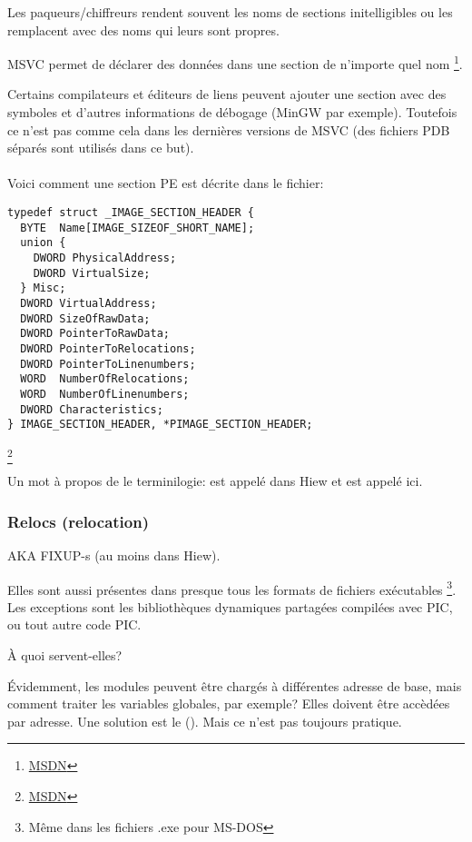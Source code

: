 Les paqueurs/chiffreurs rendent souvent les noms de sections initelligibles ou les
remplacent avec des noms qui leurs sont propres.

\ac{MSVC} permet de déclarer des données dans une section de n'importe quel nom
\footnote{\href{http://go.yurichev.com/17047}{MSDN}}.

Certains compilateurs et éditeurs de liens peuvent ajouter une section avec des symboles
et d'autres informations de débogage (MinGW par exemple).
Toutefois ce n'est pas comme cela dans les dernières versions de \ac{MSVC} (des fichiers
\gls{PDB} séparés sont utilisés dans ce but).\\
\\
Voici comment une section PE est décrite dans le fichier:

\begin{lstlisting}
typedef struct _IMAGE_SECTION_HEADER {
  BYTE  Name[IMAGE_SIZEOF_SHORT_NAME];
  union {
    DWORD PhysicalAddress;
    DWORD VirtualSize;
  } Misc;
  DWORD VirtualAddress;
  DWORD SizeOfRawData;
  DWORD PointerToRawData;
  DWORD PointerToRelocations;
  DWORD PointerToLinenumbers;
  WORD  NumberOfRelocations;
  WORD  NumberOfLinenumbers;
  DWORD Characteristics;
} IMAGE_SECTION_HEADER, *PIMAGE_SECTION_HEADER;
\end{lstlisting}
\footnote{\href{http://go.yurichev.com/17048}{MSDN}}

Un mot à propos de le terminilogie:  est appelé  dans
Hiew et  est appelé  ici.

\subsubsection{Relocs (relocation)}
\label{subsec:relocs}

\ac{AKA} FIXUP-s (au moins dans Hiew).

Elles sont aussi présentes dans presque tous les formats de fichiers exécutables
\footnote{Même dans les fichiers .exe pour MS-DOS}.
Les exceptions sont les bibliothèques dynamiques partagées compilées avec \ac{PIC},
ou tout autre code \ac{PIC}.

À quoi servent-elles?

Évidemment, les modules peuvent être chargés à différentes adresse de base, mais
comment traiter les variables globales, par exemple? Elles doivent être accèdées
par adresse. Une solution est le \PICcode{} ().
Mais ce n'est pas toujours pratique.

